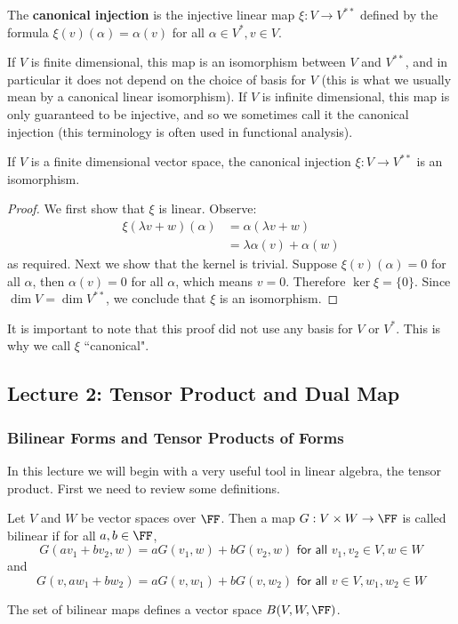 \begin{defn}
The \textbf{canonical injection} is the injective linear map $\xi : V \to V^{**}$ defined by the formula $\xi(v)(\alpha) = \alpha(v)$ for all $\alpha \in V^*, v \in V$.
\end{defn}
If $V$ is finite dimensional, this map is an isomorphism between $V$ and $V^{**}$, and in particular it does not depend on the choice of basis for $V$ (this is what we usually mean by a canonical linear isomorphism). If $V$ is infinite dimensional, this map is only guaranteed to be injective, and so we sometimes call it the canonical injection (this terminology is often used in functional analysis).

\begin{thm}
If $V$ is a finite dimensional vector space, the canonical injection $\xi : V \to V^{**}$ is an isomorphism.
\end{thm}
\begin{proof}We first show that $\xi$ is linear. Observe: 
\begin{align*}\xi(\lambda v + w)(\alpha) &= \alpha(\lambda v + w) \\&= \lambda \alpha(v) + \alpha(w)\end{align*} as required. Next we show that the kernel is trivial. Suppose $\xi(v)(\alpha)=0$ for all $\alpha$, then $\alpha(v)=0$ for all $\alpha$, which means $v=0$. Therefore  $\ker \xi = \{0\}$. Since $\dim V = \dim V^{**}$, we conclude that $\xi$ is an isomorphism.\end{proof} 

It is important to note that this proof did not use any basis for $V$ or $V^*$. This is why we call $\xi$ ``canonical".

\subsection{Lecture 2: Tensor Product and Dual Map}
\subsubsection{Bilinear Forms and Tensor Products of Forms}
In this lecture we will begin with a very useful tool in linear algebra, the tensor product. First we need to review some definitions.

\begin{defn} Let $V$ and $W$ be vector spaces over $\FF$. Then a map $G : V\times W \to \FF$ is called bilinear if for all $a,b\in \FF$, 
\[G(av_1+bv_2,w) = aG(v_1,w)+bG(v_2,w) \textsf{ for all } v_1,v_2\in V, w\in W\] 
and 
\[G(v,aw_1+bw_2)=aG(v,w_1)+bG(v,w_2) \textsf{ for all }v\in V, w_1,w_2 \in W\]

The set of bilinear maps defines a vector space $B(V,W,\FF)$.
\end{defn}

